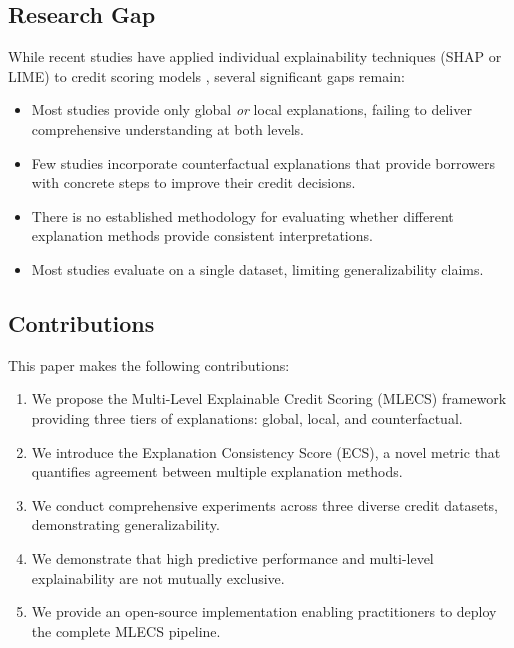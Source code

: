 \documentclass[journal]{IEEEtran}
\begin{document}
\subsection{Research Gap}

While recent studies have applied individual explainability techniques (SHAP or LIME) to credit scoring models \cite{bracke2019, bussmann2021, misheva2021, yang2023}, several significant gaps remain:

\begin{itemize}
\item Most studies provide only global \textit{or} local explanations, failing to deliver comprehensive understanding at both levels.
\item Few studies incorporate counterfactual explanations that provide borrowers with concrete steps to improve their credit decisions.
\item There is no established methodology for evaluating whether different explanation methods provide consistent interpretations.
\item Most studies evaluate on a single dataset, limiting generalizability claims.
\end{itemize}

\subsection{Contributions}

This paper makes the following contributions:

\begin{enumerate}
\item We propose the Multi-Level Explainable Credit Scoring (MLECS) framework providing three tiers of explanations: global, local, and counterfactual.

\item We introduce the Explanation Consistency Score (ECS), a novel metric that quantifies agreement between multiple explanation methods.

\item We conduct comprehensive experiments across three diverse credit datasets, demonstrating generalizability.

\item We demonstrate that high predictive performance and multi-level explainability are not mutually exclusive.

\item We provide an open-source implementation enabling practitioners to deploy the complete MLECS pipeline.
\end{enumerate}
\end{document}
